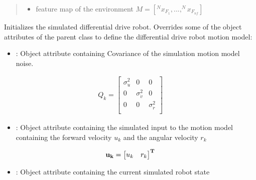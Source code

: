 \documentclass[letterpaper,10pt,english]{sphinxmanual}
\begin{document}
\begin{fulllineitems}
\begin{fulllineitems}
\begin{quote}
\begin{description}
\begin{itemize}
\item {} 
\sphinxAtStartPar
{} \textendash{} feature map of the environment \(M=[^Nx_{F_1},...,^Nx_{F_{nf}}]\)

\end{itemize}

\end{description}\end{quote}

\sphinxAtStartPar
Initializes the simulated differential drive robot. Overrides some of the object attributes of the parent class  to define the differential drive robot motion model:
\begin{itemize}
\item {} 
\sphinxAtStartPar
{} : Object attribute containing Covariance of the simulation motion model noise.

\end{itemize}
\begin{equation}\label{equation:robot_simulation:eq:Qsk}
\begin{split}Q_k=\begin{bmatrix}\sigma_{\dot u}^2 & 0 & 0\\
0 & \sigma_{\dot v}^2 & 0 \\
0 & 0 & \sigma_{\dot r}^2 \\
\end{bmatrix}\end{split}
\end{equation}\begin{itemize}
\item {} 
\sphinxAtStartPar
{} : Object attribute containing the simulated input to the motion model containing the forward velocity \(u_k\) and the angular velocity \(r_k\)

\end{itemize}
\begin{equation}\label{equation:robot_simulation:eq:usk}
\begin{split}\bf{u_k}=\begin{bmatrix}u_k & r_k\end{bmatrix}^T\end{split}
\end{equation}\begin{itemize}
\item {} 
\sphinxAtStartPar
{} : Object attribute containing the current simulated robot state


\end{itemize}
\end{fulllineitems}
\end{fulllineitems}
\end{document}
